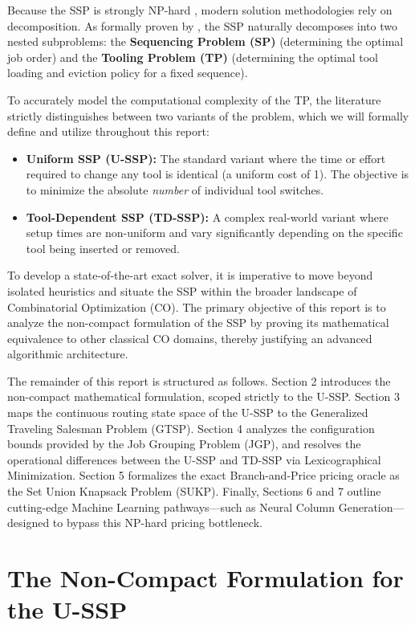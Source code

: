 \documentclass[12pt]{article}
\begin{document}
	Because the SSP is strongly NP-hard \citep{Crama1994}, modern solution methodologies rely on decomposition. As formally proven by \citet{Tang1988}, the SSP naturally decomposes into two nested subproblems: the \textbf{Sequencing Problem (SP)} (determining the optimal job order) and the \textbf{Tooling Problem (TP)} (determining the optimal tool loading and eviction policy for a fixed sequence).
	
	To accurately model the computational complexity of the TP, the literature strictly distinguishes between two variants of the problem, which we will formally define and utilize throughout this report:
	\begin{itemize}[noitemsep]
		\item \textbf{Uniform SSP (U-SSP):} The standard variant where the time or effort required to change any tool is identical (a uniform cost of 1). The objective is to minimize the absolute \textit{number} of individual tool switches.
		\item \textbf{Tool-Dependent SSP (TD-SSP):} A complex real-world variant where setup times are non-uniform and vary significantly depending on the specific tool being inserted or removed. 
	\end{itemize}
	
	To develop a state-of-the-art exact solver, it is imperative to move beyond isolated heuristics and situate the SSP within the broader landscape of Combinatorial Optimization (CO). The primary objective of this report is to analyze the non-compact formulation of the SSP by proving its mathematical equivalence to other classical CO domains, thereby justifying an advanced algorithmic architecture.
	
	The remainder of this report is structured as follows. Section 2 introduces the non-compact mathematical formulation, scoped strictly to the U-SSP. Section 3 maps the continuous routing state space of the U-SSP to the Generalized Traveling Salesman Problem (GTSP). Section 4 analyzes the configuration bounds provided by the Job Grouping Problem (JGP), and resolves the operational differences between the U-SSP and TD-SSP via Lexicographical Minimization. Section 5 formalizes the exact Branch-and-Price pricing oracle as the Set Union Knapsack Problem (SUKP). Finally, Sections 6 and 7 outline cutting-edge Machine Learning pathways—such as Neural Column Generation—designed to bypass this NP-hard pricing bottleneck.

	
	
	\section{The Non-Compact Formulation for the U-SSP}
	\label{sec:non_compact}
	
\end{document}
